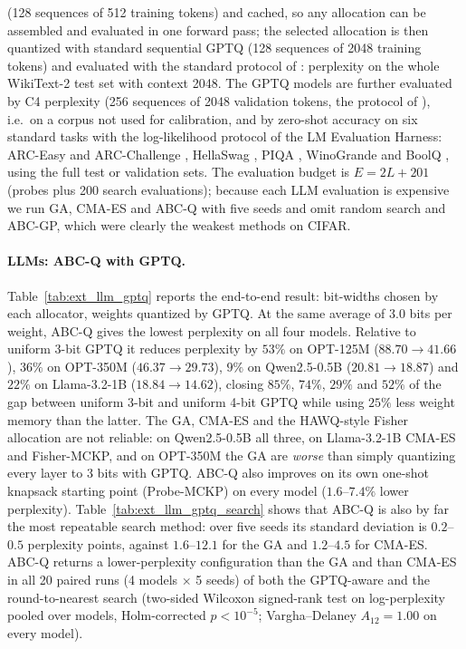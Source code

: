 \documentclass[11pt,a4paper]{article}
\begin{document}
(128 sequences of 512 training tokens) and cached, so any allocation can be assembled and evaluated in one
forward pass; the selected allocation is then quantized with standard sequential GPTQ (128 sequences of
2048 training tokens) and evaluated with the standard protocol of \citet{Frantar2023GPTQ}: perplexity on the
whole WikiText-2 test set with context 2048. The GPTQ models are further evaluated by C4 perplexity
(256 sequences of 2048 validation tokens, the protocol of \citet{Frantar2023GPTQ}), i.e.\ on a corpus not
used for calibration, and by zero-shot accuracy on six standard tasks with the log-likelihood protocol of
the LM Evaluation Harness: ARC-Easy and ARC-Challenge \citep{Clark2018ARC}, HellaSwag \citep{Zellers2019HellaSwag},
PIQA \citep{Bisk2020PIQA}, WinoGrande \citep{Sakaguchi2020WinoGrande} and BoolQ \citep{Clark2019BoolQ}, using
the full test or validation sets. The evaluation budget is $E=2L+201$ (probes plus 200 search
evaluations); because each LLM evaluation is expensive we run GA, CMA-ES and ABC-Q with five seeds and
omit random search and ABC-GP, which were clearly the weakest methods on CIFAR.



\paragraph{LLMs: ABC-Q with GPTQ.} Table~\ref{tab:ext_llm_gptq} reports the end-to-end result: bit-widths
chosen by each allocator, weights quantized by GPTQ. At the same average of $3.0$ bits per weight, ABC-Q
gives the lowest perplexity on all four models. Relative to uniform 3-bit GPTQ it reduces perplexity by
$53\%$ on OPT-125M ($88.70\to41.66$), $36\%$ on OPT-350M ($46.37\to29.73$), $9\%$ on Qwen2.5-0.5B
($20.81\to18.87$) and $22\%$ on Llama-3.2-1B ($18.84\to14.62$), closing $85\%$, $74\%$, $29\%$ and $52\%$
of the gap between uniform 3-bit and uniform 4-bit GPTQ while using $25\%$ less weight memory than the
latter. The GA, CMA-ES and the HAWQ-style Fisher allocation are not reliable: on Qwen2.5-0.5B all three,
on Llama-3.2-1B CMA-ES and Fisher-MCKP, and on OPT-350M the GA are \emph{worse} than simply quantizing every layer to 3 bits
with GPTQ. ABC-Q also improves on its own one-shot knapsack starting point (Probe-MCKP) on every model
($1.6$--$7.4\%$ lower perplexity). Table~\ref{tab:ext_llm_gptq_search} shows that ABC-Q is also by far the
most repeatable search method: over five seeds its standard deviation is $0.2$--$0.5$ perplexity points,
against $1.6$--$12.1$ for the GA and $1.2$--$4.5$ for CMA-ES. ABC-Q returns a lower-perplexity
configuration than the GA and than CMA-ES in all 20 paired runs (4 models $\times$ 5 seeds) of both the
GPTQ-aware and the round-to-nearest search (two-sided Wilcoxon signed-rank test on log-perplexity pooled
over models, Holm-corrected $p<10^{-5}$; Vargha--Delaney $A_{12}=1.00$ on every model).
\end{document}
